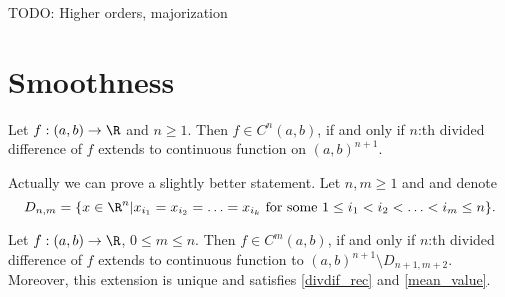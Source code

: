 TODO: Higher orders, majorization

\section{Smoothness}

\begin{lause}
	Let $f : (a, b) \to \R$ and $n \geq 1$. Then $f \in C^{n}(a, b)$, if and only if $n$:th divided difference of $f$ extends to continuous function on $(a, b)^{n + 1}$.
\end{lause}

Actually we can prove a slightly better statement. Let $n, m \geq 1$ and and denote
\[
	D_{n, m} = \{x \in \R^{n} | x_{i_{1}} = x_{i_{2}} = \ldots = x_{i_{k}} \text{ for some $1 \leq i_{1} < i_{2} < \ldots < i_{m} \leq n$} \}.
\]
\begin{lause}
	Let $f : (a, b) \to \R$, $0 \leq m \leq n$. Then $f \in C^{m}(a, b)$, if and only if $n$:th divided difference of $f$ extends to continuous function to $(a, b)^{n + 1} \setminus D_{n + 1, m + 2}$. Moreover, this extension is unique and satisfies \ref{divdif_rec} and \ref{mean_value}.
\end{lause}


